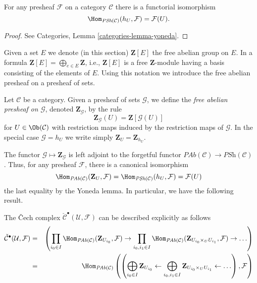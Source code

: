 \begin{lemma}
\label{lemma-yoneda-presheaf}
For any presheaf $\mathcal{F}$ on a category $\mathcal{C}$ there is a
functorial isomorphism
$$
\Hom_{\textit{PSh}(\mathcal{C})}(h_U, \mathcal{F}) =
\mathcal{F}(U).
$$
\end{lemma}

\begin{proof}
See Categories, Lemma \ref{categories-lemma-yoneda}.
\end{proof}

\noindent
Given a set $E$ we denote (in this section)
$\mathbf{Z}[E]$ the free abelian group on $E$. In a formula
$\mathbf{Z}[E] = \bigoplus_{e \in E} \mathbf{Z}$, i.e., $\mathbf{Z}[E]$ is
a free $\mathbf{Z}$-module having a basis consisting of the elements of $E$.
Using this notation we introduce the free abelian presheaf on a
presheaf of sets.

\begin{definition}
\label{definition-free-abelian-presheaf}
Let $\mathcal{C}$ be a category.
Given a presheaf of sets $\mathcal{G}$, we define the
{\it free abelian presheaf on $\mathcal{G}$},
denoted $\mathbf{Z}_\mathcal{G}$, by the rule
$$
\mathbf{Z}_\mathcal{G}(U)
=
\mathbf{Z}[\mathcal{G}(U)]
$$
for $U \in \Ob(\mathcal{C})$
with restriction maps induced by the restriction maps of $\mathcal{G}$.
In the special case $\mathcal{G} = h_U$ we write simply
$\mathbf{Z}_U = \mathbf{Z}_{h_U}$.
\end{definition}

\noindent
The functor $\mathcal{G} \mapsto \mathbf{Z}_\mathcal{G}$ is left adjoint to the
forgetful functor $\textit{PAb}(\mathcal{C}) \to \textit{PSh}(\mathcal{C})$.
Thus, for any presheaf $\mathcal{F}$, there is a canonical isomorphism
$$
\Hom_{\textit{PAb}(\mathcal{C})}(\mathbf{Z}_U, \mathcal{F})
=
\Hom_{\textit{PSh}(\mathcal{C})}(h_U, \mathcal{F})
=
\mathcal{F}(U)
$$
the last equality by the Yoneda lemma. In particular, we have the following
result.

\begin{lemma}
\label{lemma-cech-complex-describe}
The {\v C}ech complex $\check{\mathcal{C}}^\bullet(\mathcal{U}, \mathcal{F})$
can be described explicitly as follows
\begin{eqnarray*}
\check{\mathcal{C}}^\bullet(\mathcal{U}, \mathcal{F})
& = &
\left(
\prod_{i_0 \in I}
\Hom_{\textit{PAb}(\mathcal{C})}(\mathbf{Z}_{U_{i_0}}, \mathcal{F}) \to
\prod_{i_0, i_1 \in I}
\Hom_{\textit{PAb}(\mathcal{C})}(
\mathbf{Z}_{U_{i_0} \times_U U_{i_1}}, \mathcal{F}) \to \ldots
\right) \\
& = &
\Hom_{\textit{PAb}(\mathcal{C})}\left(
\left(
\bigoplus_{i_0 \in I} \mathbf{Z}_{U_{i_0}} \leftarrow
\bigoplus_{i_0, i_1 \in I} \mathbf{Z}_{U_{i_0} \times_U U_{i_1}} \leftarrow
\ldots
\right), \mathcal{F}\right)
\end{eqnarray*}
\end{lemma}

